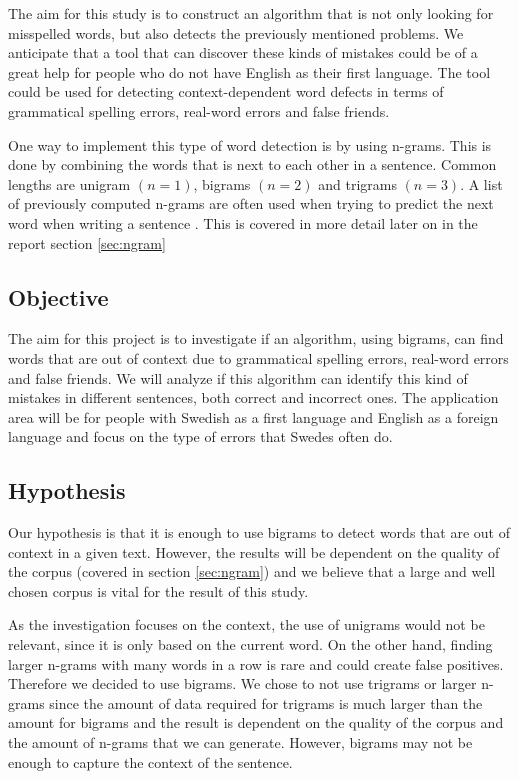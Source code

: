 \documentclass[a4paper,12pt]{article}
\begin{document}
The aim for this study is to construct an algorithm that is not only looking for misspelled words, but also detects the previously mentioned problems. We anticipate that a tool that can discover these kinds of mistakes could be of a great help for people who do not have English as their first language. The tool could be used for detecting context-dependent word defects in terms of grammatical spelling errors, real-word errors and false friends.

One way to implement this type of word detection is by using n-grams. This is done by combining the words that is next to each other in a sentence. Common lengths are unigram $(n=1)$, bigrams $(n=2)$ and trigrams $(n=3)$. A list of previously computed n-grams are often used when trying to predict the next word when writing a sentence \cite{gallagher2004natural}. This is covered in more detail later on in the report section \ref{sec:ngram}

\subsection{Objective}
\label{sec:objective}
The aim for this project is to investigate if an algorithm, using bigrams, can find words that are out of context due to grammatical spelling errors, real-word errors and false friends. We will analyze if this algorithm can identify this kind of mistakes in different sentences, both correct and incorrect ones. The application area will be for people with Swedish as a first language and English as a foreign language and focus on the type of errors that Swedes often do. 

\subsection{Hypothesis}
Our hypothesis is that it is enough to use bigrams to detect words that are out of context in a given text. However, the results will be dependent on the quality of the corpus (covered in section \ref{sec:ngram}) and we believe that a large and well chosen corpus is vital for the result of this study.

As the investigation focuses on the context, the use of unigrams would not be relevant, since it is only based on the current word. On the other hand, finding larger n-grams with many words in a row is rare and could create false positives. Therefore we decided to use bigrams. We chose to not use trigrams or larger n-grams since the amount of data required for trigrams is much larger than the amount for bigrams and the result is dependent on the quality of the corpus and the amount of n-grams that we can generate. However, bigrams may not be enough to capture the context of the sentence. 
\end{document}
